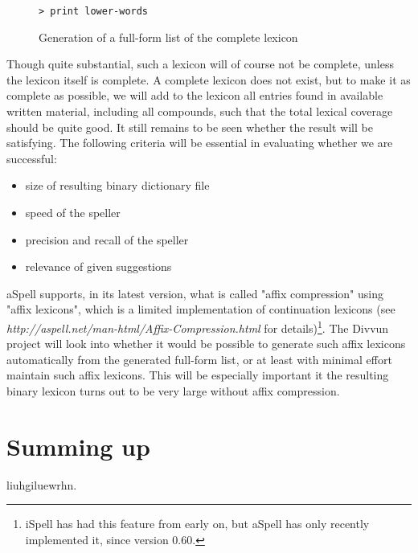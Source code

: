 \documentclass[a4paper,english]{article}
\begin{document}

\begin{figure}[htbp]
\begin{center}
\begin{verbatim}
> print lower-words
\end{verbatim}
\caption{Generation of a full-form list of the complete lexicon}
\label{fullistgen}
\end{center}
\end{figure}


Though quite substantial, such a lexicon will of course not be complete, unless the lexicon itself is complete. A complete lexicon does not exist, but to make it as complete as possible, we will add to the lexicon all entries found in available written material, including all compounds, such that the total lexical coverage should be quite good. It still remains to be seen whether the result will be satisfying. The following criteria will be essential in evaluating whether we are successful:

\begin{itemize}
\item size of resulting binary dictionary file
\item speed of the speller
\item precision and recall of the speller
\item relevance of given suggestions
\end{itemize}

aSpell supports, in its latest version, what is called "affix compression" using "affix lexicons", which is a limited implementation of continuation lexicons (see \textit{http://aspell.net/man-html/Affix-Compression.html} for details)\footnote{iSpell has had this feature from early on, but aSpell has only recently implemented it, since version 0.60.}. The Divvun project will look into whether it would be possible to generate such affix lexicons automatically from the generated full-form list, or at least with minimal effort maintain such affix lexicons. This will be especially important it the resulting binary lexicon turns out to be very large without affix compression.

\section{Summing up}

liuhgiluewrhn.

 



\end{document}
